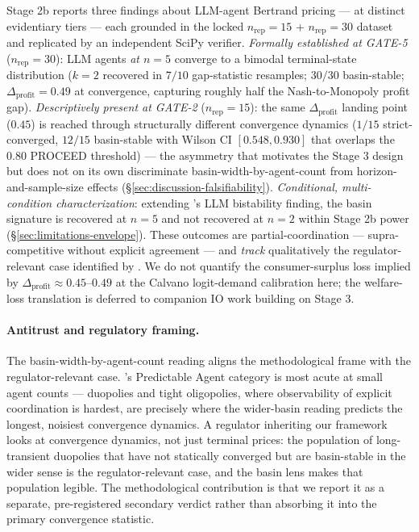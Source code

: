 Stage 2b reports three findings about LLM-agent Bertrand pricing --- at distinct
evidentiary tiers --- each grounded in the locked $n_{\text{rep}} = 15$ +
$n_{\text{rep}} = 30$ dataset and replicated by an independent SciPy verifier.
\emph{Formally established at GATE-5} ($n_{\text{rep}} = 30$): LLM agents \emph{at
$n = 5$} converge to a bimodal terminal-state distribution ($k = 2$ recovered in $7/10$
gap-statistic resamples; $30/30$ basin-stable; $\Delta_{\text{profit}} = 0.49$ at
convergence, capturing roughly half the Nash-to-Monopoly profit gap).
\emph{Descriptively present at GATE-2} ($n_{\text{rep}} = 15$): the same
$\Delta_{\text{profit}}$ landing point ($0.45$) is reached through structurally
different convergence dynamics ($1/15$ strict-converged, $12/15$ basin-stable with
Wilson CI $[0.548, 0.930]$ that overlaps the $0.80$ PROCEED threshold) --- the
asymmetry that motivates the Stage 3 design but does not on its own discriminate
basin-width-by-agent-count from horizon-and-sample-size effects
(\S\ref{sec:discussion-falsifiability}). \emph{Conditional, multi-condition
characterization}: extending \citet{Cao_2026_llm_collusion}'s LLM bistability finding,
the basin signature is recovered at $n = 5$ and not recovered at $n = 2$ within Stage
2b power (\S\ref{sec:limitations-envelope}). These outcomes are partial-coordination
--- supra-competitive without explicit agreement --- and \emph{track} qualitatively
the regulator-relevant case identified by \citet{ezrachi2016virtual,asker2021ai_pricing}.
We do not quantify the consumer-surplus loss implied by $\Delta_{\text{profit}} \approx 0.45$--$0.49$
at the Calvano logit-demand calibration here; the welfare-loss translation is deferred to
companion IO work building on Stage 3.

\paragraph{Antitrust and regulatory framing.}
The basin-width-by-agent-count reading aligns the methodological frame with the regulator-relevant case. \citet{ezrachi2016virtual}'s Predictable Agent category is most acute at small agent counts --- duopolies and tight oligopolies, where observability of explicit coordination is hardest, are precisely where the wider-basin reading predicts the longest, noisiest convergence dynamics. A regulator inheriting our framework looks at convergence dynamics, not just terminal prices: the population of long-transient duopolies that have not statically converged but are basin-stable in the wider sense is the regulator-relevant case, and the basin lens makes that population legible. The methodological contribution is that we report it as a separate, pre-registered secondary verdict rather than absorbing it into the primary convergence statistic.

